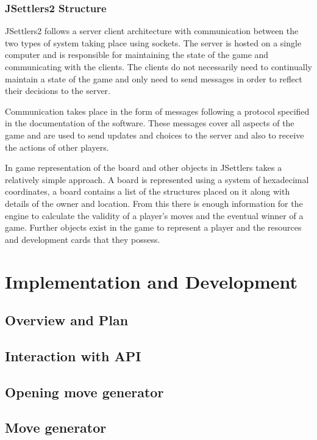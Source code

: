 \documentclass[]{article}
\let\oldsection\section
\renewcommand\section{\clearpage\oldsection}
\begin{document}
\subsubsection{JSettlers2 Structure}
JSettlers2 follows a server client architecture with communication between the two types of system taking place using sockets. The server is hosted on a single computer and is responsible for maintaining the state of the game and communicating with the clients. The clients do not necessarily need to continually maintain a state of the game and only need to send messages in order to reflect their decisions to the server.

\par Communication takes place in the form of messages following a protocol specified in the documentation of the software. These messages cover all aspects of the game and are used to send updates and choices to the server and also to receive the actions of other players.

\par In game representation of the board and other objects in JSettlers takes a relatively simple approach. A board is represented using a system of hexadecimal coordinates, a board contains a list of the structures placed on it along with details of the owner and location. From this there is enough information for the engine to calculate the validity of a player's moves and the eventual winner of a game. Further objects exist in the game to represent a player and the resources and development cards that they possess. 


\section{Implementation and Development}

\subsection{Overview and Plan}


\subsection{Interaction with API}

\subsection{Opening move generator}

\subsection{Move generator}
\end{document}
